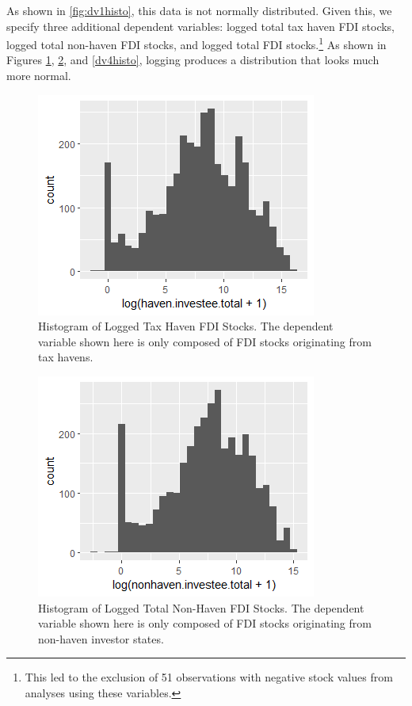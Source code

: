 \documentclass[11pt, titlepage]{article} %
\begin{document}
As shown in \ref{fig:dv1histo}, this data is not normally distributed. Given this, we specify three additional dependent variables: logged total tax haven FDI stocks, logged total non-haven FDI stocks, and logged total FDI stocks.\footnote{This led to the exclusion of 51 observations with negative stock values from analyses using these variables.} As shown in Figures \ref{dv2histo}, \ref{dv3histo}, and \ref{dv4histo}, logging produces a distribution that looks much more normal.

	\begin{figure}
 \centering
		\includegraphics[scale=1]{dv2histo.png}
		\caption{Histogram of Logged Tax Haven FDI Stocks. The dependent variable shown here is only composed of FDI stocks originating from tax havens.}
		\label{dv2histo}
	\end{figure}

	\begin{figure}
 \centering
		\includegraphics[scale=1]{dv3histo.png}
		\caption{Histogram of Logged Total Non-Haven FDI Stocks. The dependent variable shown here is only composed of FDI stocks originating from non-haven investor states.}
		\label{dv3histo}
	\end{figure}
\end{document}

